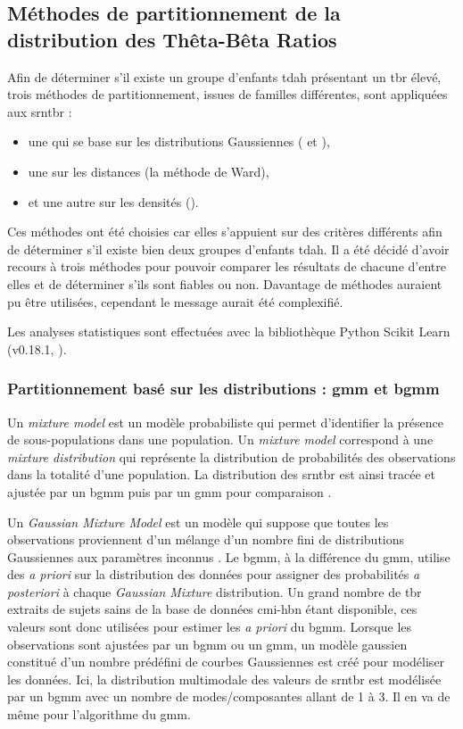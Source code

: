 \subsection{Méthodes de partitionnement de la distribution des Thêta-Bêta Ratios} \label{clustering}

Afin de déterminer s'il existe un groupe d'enfants \gls{tdah} présentant un \gls{tbr} élevé, trois méthodes de partitionnement, issues de familles différentes,
sont appliquées aux \gls{srntbr} : 
\begin{itemize}
\item une qui se base sur les distributions Gaussiennes ( et ), 
\item une sur les distances (la méthode de Ward),
\item et une autre sur les densités (). 
\end{itemize}

Ces méthodes ont été choisies car elles s'appuient sur des critères différents afin de déterminer s'il existe bien deux groupes d'enfants \gls{tdah}. Il a été décidé
d'avoir recours à trois méthodes pour pouvoir comparer les résultats de chacune d'entre elles et de déterminer s'ils sont fiables ou non. Davantage de méthodes auraient pu
être utilisées, cependant le message aurait été complexifié.   

Les analyses statistiques sont effectuées avec la bibliothèque Python Scikit Learn (v0.18.1, \citet{Pedregosa2011}).

\subsubsection{Partitionnement basé sur les distributions : \gls{gmm} et \gls{bgmm}} 
Un \textit{mixture model} est un modèle probabiliste qui permet d'identifier la présence de sous-populations dans une population. Un \textit{mixture model}
correspond à une \textit{mixture distribution} qui représente la distribution de probabilités des observations dans la totalité d'une population.
La distribution des \gls{srntbr} est ainsi tracée et ajustée par un \gls{bgmm} puis par un \gls{gmm} pour comparaison \citep{Attias2000, Blei2006}. 

Un \textit{Gaussian Mixture Model} est un modèle qui suppose que toutes les observations proviennent d'un mélange 
d'un nombre fini de distributions Gaussiennes aux paramètres inconnus \citep{Yu2016}. 
Le \gls{bgmm}, à la différence du \gls{gmm}, utilise des \textit{a priori} sur la distribution des données pour 
assigner des probabilités \textit{a posteriori} à chaque \textit{Gaussian Mixture} distribution. Un grand nombre de \gls{tbr} 
extraits de sujets sains de la base de données \gls{cmi-hbn} étant disponible, ces valeurs sont donc utilisées pour estimer les \textit{a priori} du \gls{bgmm}. 
Lorsque les observations sont ajustées par un \gls{bgmm} ou un \gls{gmm}, un modèle gaussien constitué d'un nombre prédéfini de courbes Gaussiennes est 
créé pour modéliser les données. Ici, la distribution multimodale des valeurs de \gls{srntbr} est modélisée par un \gls{bgmm} avec un nombre 
de modes/composantes allant de 1 à 3. 
Il en va de même pour l'algorithme du \gls{gmm}. 


